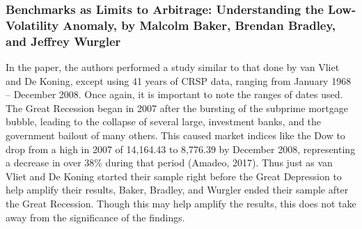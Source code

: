 \documentclass[12pt,twoside]{reedthesis}
\theoremstyle{definition}
\theoremstyle{definition}
\theoremstyle{definition}
\theoremstyle{remark}
\begin{document}
\subsubsection{Benchmarks as Limits to Arbitrage: Understanding the
Low-Volatility Anomaly, by Malcolm Baker, Brendan Bradley, and Jeffrey
Wurgler}\label{benchmarks-as-limits-to-arbitrage-understanding-the-low-volatility-anomaly-by-malcolm-baker-brendan-bradley-and-jeffrey-wurgler}

In the paper, the authors performed a study similar to that done by van
Vliet and De Koning, except using 41 years of CRSP data, ranging from
January 1968 -- December 2008. Once again, it is important to note the
ranges of dates used. The Great Recession began in 2007 after the
bursting of the subprime mortgage bubble, leading to the collapse of
several large, investment banks, and the government bailout of many
others. This caused market indices like the Dow to drop from a high in
2007 of 14,164.43 to 8,776.39 by December 2008, representing a decrease
in over 38\% during that period (Amadeo, 2017). Thus just as van Vliet
and De Koning started their sample right before the Great Depression to
help amplify their results, Baker, Bradley, and Wurgler ended their
sample after the Great Recession. Though this may help amplify the
results, this does not take away from the significance of the findings.
\end{document}

